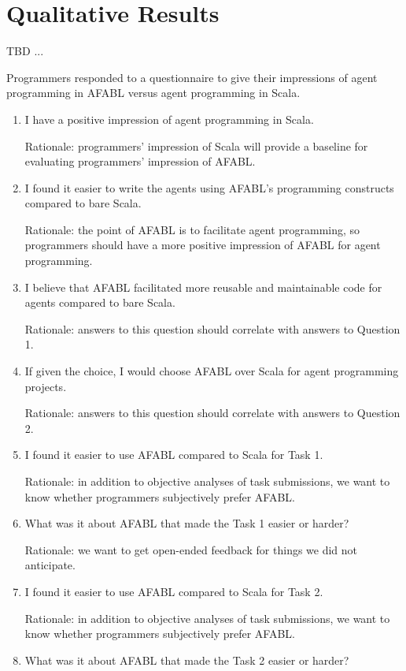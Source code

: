 \section{Qualitative Results}

TBD ...

Programmers responded to a questionnaire to give their impressions of agent programming in AFABL versus agent programming in Scala.

\begin{enumerate}
\item I have a positive impression of agent programming in Scala.

Rationale: programmers’ impression of Scala will provide a baseline for evaluating
programmers’ impression of AFABL.

\item I found it easier to write the agents using AFABL’s programming constructs compared to bare Scala.

Rationale: the point of AFABL is to facilitate agent programming, so programmers should have a more positive impression of AFABL for agent programming.

\item I believe that AFABL facilitated more reusable and maintainable code for agents compared to bare Scala.

Rationale: answers to this question should correlate with answers to Question 1.

\item If given the choice, I would choose AFABL over Scala for agent programming projects.

Rationale: answers to this question should correlate with answers to Question 2.

\item I found it easier to use AFABL compared to Scala for Task 1.

  Rationale: in addition to objective analyses of task submissions, we want to know whether programmers subjectively prefer AFABL.

\item What was it about AFABL that made the Task 1 easier or harder?

Rationale: we want to get open-ended feedback for things we did not anticipate.

\item I found it easier to use AFABL compared to Scala for Task 2.

Rationale: in addition to objective analyses of task submissions, we want to know whether programmers subjectively prefer AFABL.

\item What was it about AFABL that made the Task 2 easier or harder?

\end{enumerate}


